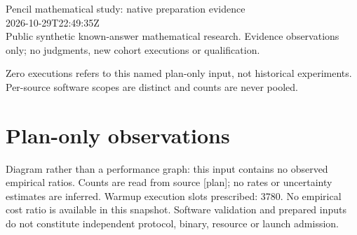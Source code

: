 \documentclass[11pt]{article}
\begin{document}
\raggedright\sloppy
{\LARGE Pencil mathematical study: native preparation evidence}\\[5pt]
2026-10-29T22:49:35Z\\
Public synthetic known-answer mathematical research. Evidence observations only; no judgments, new cohort executions or qualification.

Zero executions refers to this named plan-only input, not historical experiments. Per-source software scopes are distinct and counts are never pooled.
\section*{Plan-only observations}
\begin{center}\end{center}
Diagram rather than a performance graph: this input contains no observed empirical ratios. Counts are read from source [plan]; no rates or uncertainty estimates are inferred.
Warmup execution slots prescribed: 3780. No empirical cost ratio is available in this snapshot. Software validation and prepared inputs do not constitute independent protocol, binary, resource or launch admission.
\end{document}
